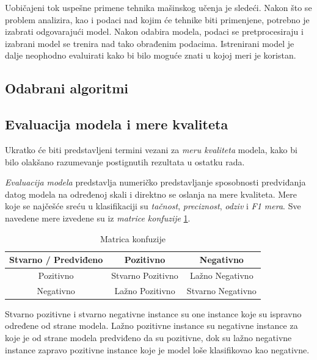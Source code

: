 \documentclass[a4paper]{article}
\begin{document}
Uobičajeni tok uspešne primene tehnika mašinskog učenja je sledeći. Nakon što se 
problem analizira, kao i podaci nad kojim će tehnike biti primenjene, potrebno je 
izabrati odgovarajući model. Nakon odabira modela, podaci se pretprocesiraju i 
izabrani model se trenira nad tako obrađenim podacima. Istrenirani model je dalje 
neophodno evaluirati kako bi bilo moguće znati u kojoj meri je koristan.

\subsection{Odabrani algoritmi}



\subsection{Evaluacija modela i mere kvaliteta}

Ukratko će biti predstavljeni termini vezani za \textit{meru kvaliteta} modela, 
kako bi bilo olakšano razumevanje postignutih rezultata u ostatku rada.

\textit{Evaluacija modela} predstavlja numeričko predstavljanje sposobnosti 
predviđanja datog modela na određenoj skali i direktno se oslanja na mere 
kvaliteta. Mere koje se najčešće sreću u klasifikaciji su \textit{tačnost}, 
\textit{preciznost}, \textit{odziv} i \textit{F1 mera}. Sve navedene mere 
izvedene su iz \textit{matrice konfuzije} \ref{table:matrica_konfuzije}.

\begin{table}[h]
	\centering
	\begin{tabular}{ |c|cc| } 
		\hline
		Stvarno / Predviđeno & Pozitivno & Negativno \\ 
		\hline
		Pozitivno & Stvarno Pozitivno & Lažno Negativno \\ 
		Negativno & Lažno Pozitivno & Stvarno Negativno \\ 
		\hline
	\end{tabular}
	\caption{Matrica konfuzije}
	\label{table:matrica_konfuzije}
\end{table}

Stvarno pozitivne i stvarno negativne instance su one instance koje su ispravno 
određene od strane modela. Lažno pozitivne instance su negativne instance za koje 
je od strane modela predviđeno da su pozitivne, dok su lažno negativne instance 
zapravo pozitivne instance koje je model loše klasifikovao kao negativne. 
\end{document}
